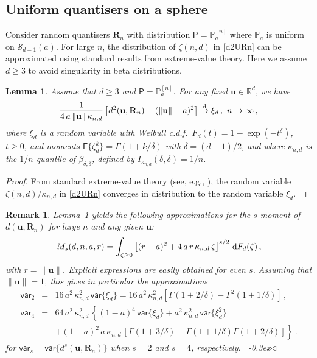 \documentclass{article}
\def\Px{\mathsf{P}}
\def\RR{\mathds{R}}
\def\Ex{\mathsf{E}}
\def\var{\mathsf{var}}
\def\PP{\mathbb{P}}
\def\SS{{\mathcal S}}
\newcommand{\bea}{\begin{eqnarray*}}
\newcommand{\eea}{\end{eqnarray*}}
\newcommand{\be}{\begin{eqnarray}}
\newcommand{\ee}{\end{eqnarray}}
\def\Rb{\mathbf{R}}
\def\ub{\mathbf{u}}
\def\dd{\mbox{\rm d}}
\def\rad{\stackrel{\rm d}{\ra}}
\def\ra{\rightarrow}
\newcommand{\fin} {\mbox{}~\hfill{\lower-0.3ex\hbox{$\triangleleft$}}}
\newtheorem{lemma}{Lemma}[section]
\newtheorem{remark}{Remark}[section]
\begin{document}
\subsection{Uniform quantisers on a sphere}\label{S:Rn-uniform-on-SS}

Consider random quantisers $\Rb_n$ with distribution $\Px=\PP_a^{[n]}$ where $\PP_a$ is uniform on $\SS_{d-1}(a)$. For large $n$, the distribution of $\zeta(n,d)$ in \eqref{d2URn} can be approximated using standard results from extreme-value theory. Here we assume $d\geq 3$ to avoid singularity in beta distributions.

\begin{lemma}\label{L:main-extreme-value2}
Assume that $d\geq 3$ and $\Px=\PP_a^{[n]}$. For any fixed $\ub\in\RR^d$, we have
\be\label{d2URnb}
\frac{1}{4\,a\,\|\ub\|\,\kappa_{n,d}} \left[d^2(\ub,\Rb_n)-(\|\ub\|-a)^2\right] \rad \xi_d \,, \ n\to\infty\,,
\ee
where $\xi_d$ is a random variable with Weibull c.d.f.\ $F_d(t)=1-\exp(-t^\delta)$, $t\geq 0$, and moments $\Ex\{\zeta_d^k\}=\Gamma(1+k/\delta)$ with $\delta=(d-1)/2$, and where $\kappa_{n,d}$ is the $1/n$ quantile of $\beta_{\delta,\delta}$, defined by $I_{\kappa_{n,d}}(\delta,\delta)=1/n$.
\end{lemma}

\begin{proof}
From standard extreme-value theory (see, e.g., \cite[p.~59]{KotzN2000}), the random variable
$\zeta(n,d)/\kappa_{n,d}$ in \eqref{d2URn} converges in distribution to the random variable $\xi_d$.
\end{proof}

\begin{remark}\label{R:moments-duRn}
Lemma~\ref{L:main-extreme-value2} yields the following approximations for the $s$-moment of $d(\ub,\Rb_n)$ for large $n$ and any given $\ub$:
\bea
M_s(d,n,a,r) = \int_{\zeta\geq 0} \left[(r-a)^2 + 4\,a\,r\,\kappa_{n,d}\,\zeta\right]^{s/2}\, \dd F_d(\zeta) \,,
\eea
with $r=\|\ub\|$.
Explicit expressions are easily obtained for even $s$. Assuming that $\|\ub\|=1$, this gives in particular the approximations
\bea
\var_2 &=& 16\,a^2\,\kappa_{n,d}^2\,\var\{\xi_d\} = 16\,a^2\,\kappa_{n,d}^2 \left[\Gamma(1+2/\delta)-\Gamma^2(1+1/\delta)\right] \,, \\
\var_4 &=& 64\,a^2\,\kappa_{n,d}^2\, \left\{(1-a)^4\,\var\{\xi_d\} + a^2\,\kappa_{n,d}^2\,\var\{\xi_d^2\} \right. \\
&& \left. + (1-a)^2\,a\,\kappa_{n,d}\,\left[\Gamma(1+3/\delta)-\Gamma(1+1/\delta)\Gamma(1+2/\delta)\right] \right\} \,.
\eea
for $\var_s=\var\{d^s(\ub,\Rb_n)\}$ when $s=2$ and $s=4$, respectively.
\fin
\end{remark}
\end{document}

